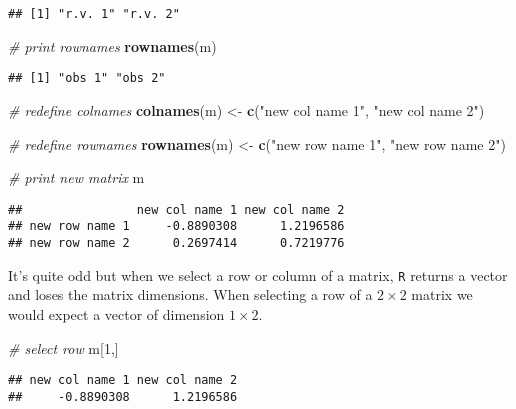 \documentclass[]{article}
\newenvironment{Shaded}{\begin{snugshade}}{\end{snugshade}}
\newcommand{\CommentTok}[1]{\textcolor[rgb]{0.56,0.35,0.01}{\textit{#1}}}
\newcommand{\DecValTok}[1]{\textcolor[rgb]{0.00,0.00,0.81}{#1}}
\newcommand{\KeywordTok}[1]{\textcolor[rgb]{0.13,0.29,0.53}{\textbf{#1}}}
\newcommand{\NormalTok}[1]{#1}
\newcommand{\StringTok}[1]{\textcolor[rgb]{0.31,0.60,0.02}{#1}}
\begin{document}
\begin{verbatim}
## [1] "r.v. 1" "r.v. 2"
\end{verbatim}

\begin{Shaded}
\begin{Highlighting}[]
\CommentTok{# print rownames}
\KeywordTok{rownames}\NormalTok{(m)}
\end{Highlighting}
\end{Shaded}

\begin{verbatim}
## [1] "obs 1" "obs 2"
\end{verbatim}

\begin{Shaded}
\begin{Highlighting}[]
\CommentTok{# redefine colnames}
\KeywordTok{colnames}\NormalTok{(m) <-}\StringTok{ }\KeywordTok{c}\NormalTok{(}\StringTok{"new col name 1"}\NormalTok{, }\StringTok{"new col name 2"}\NormalTok{)}

\CommentTok{# redefine rownames}
\KeywordTok{rownames}\NormalTok{(m) <-}\StringTok{ }\KeywordTok{c}\NormalTok{(}\StringTok{"new row name 1"}\NormalTok{, }\StringTok{"new row name 2"}\NormalTok{)}

\CommentTok{# print new matrix}
\NormalTok{m}
\end{Highlighting}
\end{Shaded}

\begin{verbatim}
##                new col name 1 new col name 2
## new row name 1     -0.8890308      1.2196586
## new row name 2      0.2697414      0.7219776
\end{verbatim}

It's quite odd but when we select a row or column of a matrix,
\texttt{R} returns a vector and loses the matrix dimensions. When
selecting a row of a \(2 \times 2\) matrix we would expect a vector of
dimension \(1 \times 2\).

\begin{Shaded}
\begin{Highlighting}[]
\CommentTok{# select row}
\NormalTok{m[}\DecValTok{1}\NormalTok{,]}
\end{Highlighting}
\end{Shaded}

\begin{verbatim}
## new col name 1 new col name 2 
##     -0.8890308      1.2196586
\end{verbatim}
\end{document}
